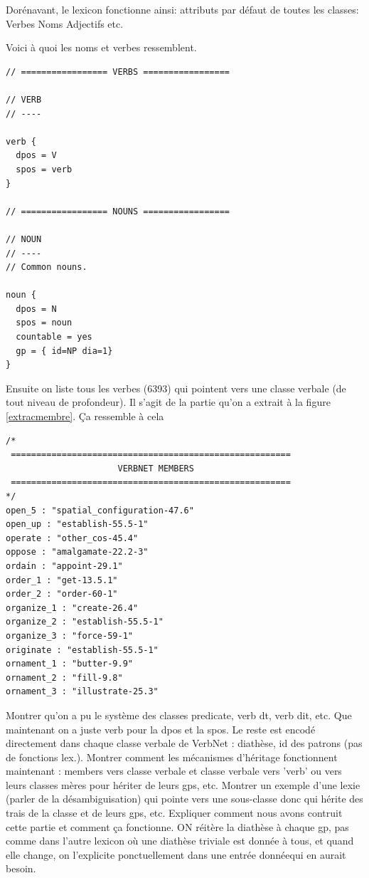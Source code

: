 Dorénavant, le lexicon fonctionne ainsi:
attributs par défaut de toutes les classes: 
Verbes
Noms
Adjectifs
etc.

Voici à quoi les noms et verbes ressemblent.
\begin{lstlisting}[language=XML, caption = Attributs par défaut des classes]
// ================= VERBS =================

// VERB
// ----

verb {
  dpos = V
  spos = verb
}

// ================= NOUNS =================

// NOUN
// ----
// Common nouns.

noun {
  dpos = N
  spos = noun
  countable = yes
  gp = { id=NP dia=1}
}
\end{lstlisting}

Ensuite on liste tous les verbes (6393) qui pointent vers une classe verbale (de tout niveau de profondeur). Il s'agit de la partie qu'on a extrait à la figure \ref{extracmembre}.
Ça ressemble à cela

\begin{lstlisting}[language=XML, caption = Partie membre du lexicon]
/*
 =======================================================
                      VERBNET MEMBERS
 =======================================================
*/
open_5 : "spatial_configuration-47.6"
open_up : "establish-55.5-1"
operate : "other_cos-45.4"
oppose : "amalgamate-22.2-3"
ordain : "appoint-29.1"
order_1 : "get-13.5.1"
order_2 : "order-60-1"
organize_1 : "create-26.4"
organize_2 : "establish-55.5-1"
organize_3 : "force-59-1"
originate : "establish-55.5-1"
ornament_1 : "butter-9.9"
ornament_2 : "fill-9.8"
ornament_3 : "illustrate-25.3"
\end{lstlisting}

Montrer qu'on a pu le système des classes predicate, verb dt, verb dit, etc. Que maintenant on a juste verb pour la dpos et la spos. Le reste est encodé directement dans chaque classe verbale de VerbNet : diathèse, id des patrons (pas de fonctions lex.). Montrer comment les mécanismes d'héritage fonctionnent maintenant : members vers classe verbale et classe verbale vers 'verb' ou vers leurs classes mères pour hériter de leurs gps, etc. Montrer un exemple d'une lexie (parler de la désambiguisation) qui pointe vers une sous-classe donc qui hérite des trais de la classe et de leurs gps, etc. Expliquer comment nous avons contruit cette partie et comment ça fonctionne. ON réitère la diathèse à chaque gp, pas comme dans l'autre lexicon où une diathèse triviale est donnée à tous, et quand elle change, on l'explicite ponctuellement dans une entrée donnéequi en aurait besoin.

